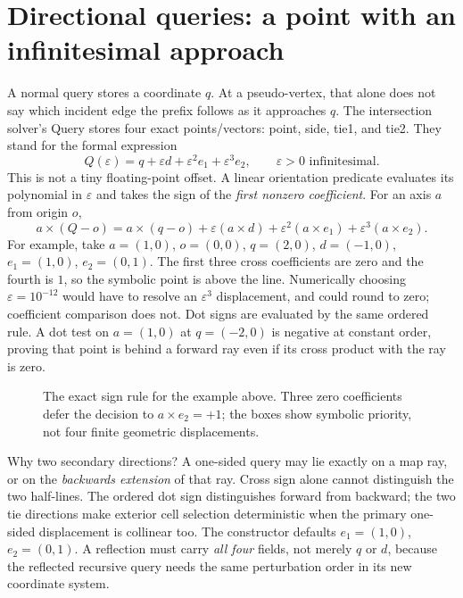 \documentclass[12pt,a4paper]{article}
\newcommand{\cross}{\mathbin{\times}}
\newcommand{\code}[1]{{\ttfamily\color{codekw}#1}}
\begin{document}
\section{Directional queries: a point with an infinitesimal approach}
A normal query stores a coordinate \(q\). At a pseudo-vertex, that alone does not say which incident edge the prefix follows as it approaches \(q\). The intersection solver's \code{Query} stores four exact points/vectors: \code{point}, \code{side}, \code{tie1}, and \code{tie2}. They stand for the formal expression
\begin{equation}\label{eq:symbolic}
Q(\varepsilon)=q+\varepsilon d+\varepsilon^2e_1+\varepsilon^3e_2,
\qquad \varepsilon>0\text{ infinitesimal}.
\end{equation}
This is not a tiny floating-point offset. A linear orientation predicate evaluates its polynomial in \(\varepsilon\) and takes the sign of the \emph{first nonzero coefficient}. For an axis \(a\) from origin \(o\),
\[
a\cross(Q-o)=a\cross(q-o)+\varepsilon(a\cross d)
+\varepsilon^2(a\cross e_1)+\varepsilon^3(a\cross e_2).
\]
For example, take \(a=(1,0)\), \(o=(0,0)\), \(q=(2,0)\), \(d=(-1,0)\), \(e_1=(1,0)\), \(e_2=(0,1)\). The first three cross coefficients are zero and the fourth is \(1\), so the symbolic point is above the line. Numerically choosing \(\varepsilon=10^{-12}\) would have to resolve an \(\varepsilon^3\) displacement, and could round to zero; coefficient comparison does not. Dot signs are evaluated by the same ordered rule. A dot test on \(a=(1,0)\) at \(q=(-2,0)\) is negative at constant order, proving that point is behind a forward ray even if its cross product with the ray is zero.

\begin{figure}[htbp]\centering\figsymbolic\caption{The exact sign rule for the example above. Three zero coefficients defer the decision to \(a\times e_2=+1\); the boxes show symbolic priority, not four finite geometric displacements.}\label{fig:symbolic}\end{figure}

Why two secondary directions? A one-sided query may lie exactly on a map ray, or on the \emph{backwards extension} of that ray. Cross sign alone cannot distinguish the two half-lines. The ordered dot sign distinguishes forward from backward; the two tie directions make exterior cell selection deterministic when the primary one-sided displacement is collinear too. The constructor defaults \(e_1=(1,0)\), \(e_2=(0,1)\). A reflection must carry \emph{all four} fields, not merely \(q\) or \(d\), because the reflected recursive query needs the same perturbation order in its new coordinate system.
\end{document}
